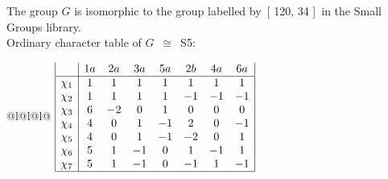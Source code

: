\documentclass[varwidth=\maxdimen,border=10]{standalone}
\begin{document}
The group $G$ is isomorphic to the group labelled by\ [ 120, 34 ]\ in the Small Groups library.\\
Ordinary character table of $G$\ $\cong$\ S5:\\
\begin{center}
\begin{tabular}{@{}l@{}l@{}l@{}}
\hline
\(\begin{array}{|l|ccccccc|}
  & 1a & 2a & 3a & 5a & 2b & 4a & 6a\\ \hline
\chi_{1} & 1 & 1 & 1 & 1 & 1 & 1 & 1\\
\chi_{2} & 1 & 1 & 1 & 1 & -1 & -1 & -1\\
\chi_{3} & 6 & -2 & 0 & 1 & 0 & 0 & 0\\
\chi_{4} & 4 & 0 & 1 & -1 & 2 & 0 & -1\\
\chi_{5} & 4 & 0 & 1 & -1 & -2 & 0 & 1\\
\chi_{6} & 5 & 1 & -1 & 0 & 1 & -1 & 1\\
\chi_{7} & 5 & 1 & -1 & 0 & -1 & 1 & -1\\
\hline
\end{array}\)\\
\end{tabular}
\end{center}
\end{document}
